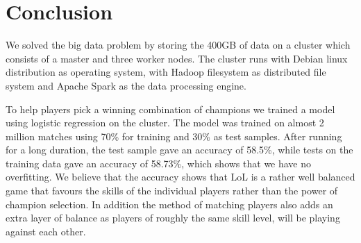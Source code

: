 \section{Conclusion}\label{sec:conclusion}
We solved the big data problem by storing the 400GB of data on a cluster which consists of a master and three worker nodes. The cluster runs with Debian linux distribution as operating system, with Hadoop filesystem as distributed file system and Apache Spark as the data processing engine.

To help players pick a winning combination of champions we trained a model using logistic regression on the cluster. The model was trained on almost 2 million matches using 70\% for training and 30\% as test samples. After running for a long duration, the test sample gave an accuracy of 58.5\%, while tests on the training data gave an accuracy of 58.73\%, which shows that we have no overfitting. We believe that the accuracy shows that LoL is a rather well balanced game that favours the skills of the individual players rather than the power of champion selection. In addition the method of matching players also adds an extra layer of balance as players of roughly the same skill level, will be playing against each other.





